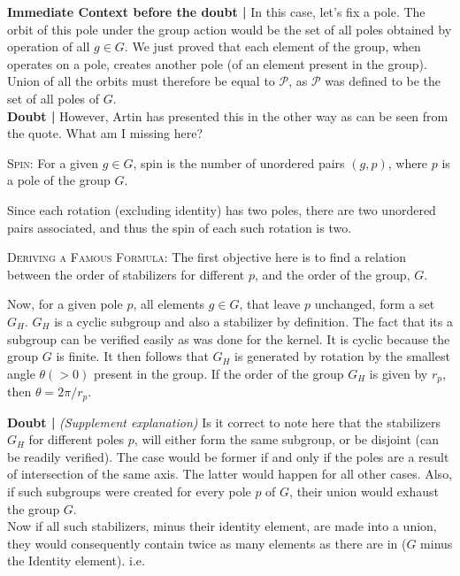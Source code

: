 \documentclass[12pt]{article}
\begin{document}
{\bf Immediate Context before the doubt | }
In this case, let's fix a pole. The orbit of this pole under the group action would be the set of all poles obtained by operation of all $g \in G$. We just proved that each element of the group, when operates on a pole, creates another pole (of an element present in the group). Union of all the orbits must therefore be equal to $\mathcal P$, as $\mathcal P$ was defined to be the set of all poles of $G$.\\
{\bf Doubt | }
However, Artin has presented this in the other way as can be seen from the quote. What am I missing here?\\

\par
\textsc {Spin: } For a given $g \in G$, spin is the number of unordered pairs $(g,p)$, where $p$ is a pole of the group $G$.
\par
Since each rotation (excluding identity) has two poles, there are two unordered pairs associated, and thus the spin of each such rotation is two.\\
\par
\textsc {Deriving a Famous Formula: } The first objective here is to find a relation between the order of stabilizers for different $p$, and the order of the group, $G$.
\par
Now, for a given pole $p$, all elements $g \in G$, that leave $p$ unchanged, form a set $G_{H}$. $G_{H}$ is a cyclic subgroup and also a stabilizer by definition. The fact that its a subgroup can be verified easily as was done for the kernel. It is cyclic because the group $G$ is finite. It then follows that $G_{H}$ is generated by rotation by the smallest angle $\theta (>0)$ present in the group. If the order of the group $G_{H}$ is given by $r_{p}$, then 
$\theta = 2 \pi/r_{p}$.
\par
{\bf Doubt | } \emph{(Supplement explanation)} Is it correct to note here that the stabilizers $G_{H}$ for different poles $p$, will either form the same subgroup, or be disjoint (can be readily verified). The case would be former if and only if the poles are a result of intersection of the same axis. The latter would happen for all other cases. Also, if such subgroups were created for every pole $p$ of $G$, their union would exhaust the group $G$.\\
Now if all such stabilizers, minus their identity element, are made into a union, they would consequently contain twice as many elements as there are in (${G}$ minus the Identity element).  i.e.\\
\end{document}
